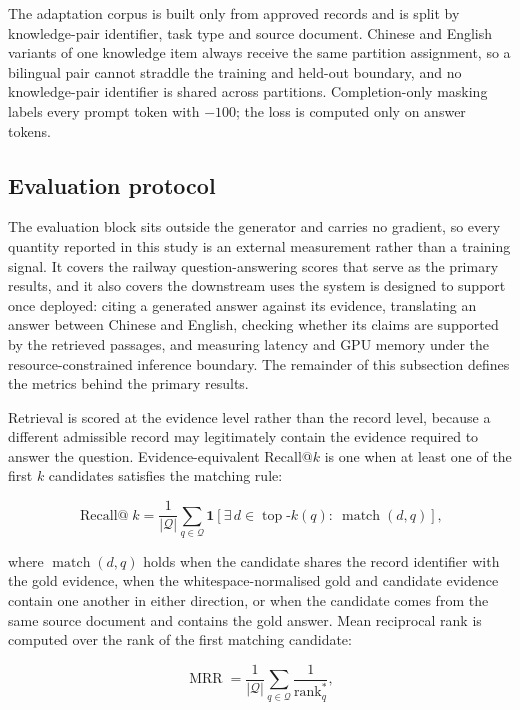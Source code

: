 \documentclass{article}
\DeclareMathOperator{\rank}{rank}
\begin{document}
The adaptation corpus is built only from approved records and is split by knowledge-pair identifier, task type and source document. Chinese and English variants of one knowledge item always receive the same partition assignment, so a bilingual pair cannot straddle the training and held-out boundary, and no knowledge-pair identifier is shared across partitions. Completion-only masking labels every prompt token with $-100$; the loss is computed only on answer tokens.

\subsection{Evaluation protocol}

The evaluation block sits outside the generator and carries no gradient, so every quantity reported in this study is an external measurement rather than a training signal. It covers the railway question-answering scores that serve as the primary results, and it also covers the downstream uses the system is designed to support once deployed: citing a generated answer against its evidence, translating an answer between Chinese and English, checking whether its claims are supported by the retrieved passages, and measuring latency and GPU memory under the resource-constrained inference boundary. The remainder of this subsection defines the metrics behind the primary results.

Retrieval is scored at the evidence level rather than the record level, because a different admissible record may legitimately contain the evidence required to answer the question. Evidence-equivalent Recall@$k$ is one when at least one of the first $k$ candidates satisfies the matching rule:

\begin{equation}
\operatorname{Recall@}k=\frac{1}{|\mathcal{Q}|}\sum_{q\in\mathcal{Q}}
\mathbf{1}\!\left[\exists\, d\in \operatorname{top}\text{-}k(q):\ \operatorname{match}(d,q)\right],
\end{equation}

where $\operatorname{match}(d,q)$ holds when the candidate shares the record identifier with the gold evidence, when the whitespace-normalised gold and candidate evidence contain one another in either direction, or when the candidate comes from the same source document and contains the gold answer. Mean reciprocal rank is computed over the rank of the first matching candidate:

\begin{equation}
\operatorname{MRR}=\frac{1}{|\mathcal{Q}|}\sum_{q\in\mathcal{Q}}\frac{1}{\rank_q^{*}},
\end{equation}
\end{document}
